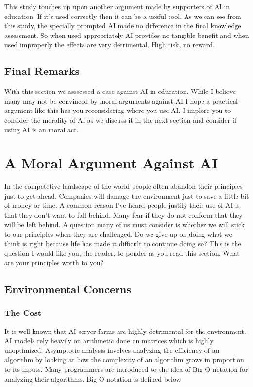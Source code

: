 \documentclass{article}[12pt]
\begin{document}
This study touches up upon another argument made by supporters of AI in education: If it's used correctly then it can be a useful tool. As we can see from this study, the specially prompted AI made no difference in the final knowledge assessment. So when used appropriately AI provides no tangible benefit and when used improperly the effects are very detrimental. High risk, no reward.

\subsection{Final Remarks}
With this section we asssessed a case against AI in education. While I believe many may not be convinced by moral arguments against AI I hope a practical argument like this has you reconsidering where you use AI. I implore you to consider the morality of AI as we discuss it in the next section and consider if using AI is an moral act.

\section{A Moral Argument Against AI}
In the competetive landscape of the world people often abandon their principles just to get ahead. Companies will damage the environment just to save a little bit of money or time. A common reason I've heard people justify their use of AI is that they don't want to fall behind. Many fear if they do not conform that they will be left behind. A question many of us must consider is whether we will stick to our principles when they are challenged. Do we give up on doing what we think is right because life has made it difficult to continue doing so? This is the question I would like you, the reader, to ponder as you read this section. What are your principles worth to you?
\subsection{Environmental Concerns}
\subsubsection{The Cost}
It is well known that AI server farms are highly detrimental for the environment. AI models rely heavily on arithmetic done on matrices which is highly unoptimized. Asymptotic analysis involves analyzing the efficiency of an algorithm by looking at how the complexity of an algorithm grows in proportion to its inputs. Many programmers are introduced to the idea of Big O notation for analyzing their algorithms. Big O notation is defined below
\end{document}
